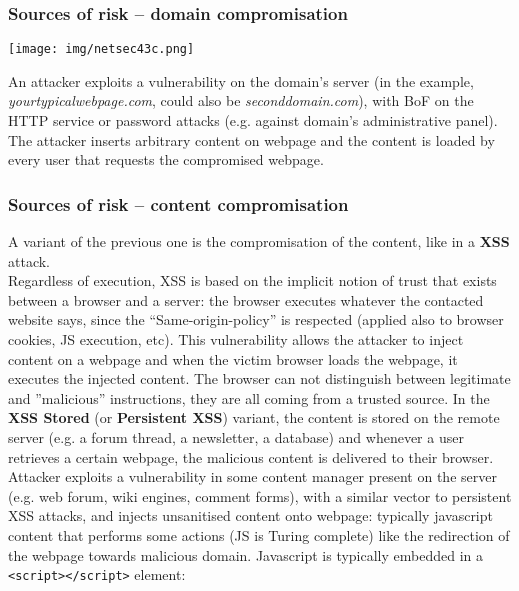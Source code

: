 \documentclass[a4paper, 10pt, titlepage]{article}
\begin{document}
\subsubsection*{Sources of risk – domain compromisation}
\begin{center}
	\texttt{[image: img/netsec43c.png]}
\end{center}
An attacker exploits a vulnerability on the domain’s server (in the example, \textit{yourtypicalwebpage.com}, could also be \textit{seconddomain.com}), with BoF on the HTTP service or password attacks (e.g. against domain’s administrative panel). The attacker inserts arbitrary content on webpage and the content is loaded by every user that requests the compromised webpage.

\subsubsection*{Sources of risk – content compromisation}
A variant of the previous one is the compromisation of the content, like in a \textbf{XSS} attack. \medskip\\
Regardless of execution, XSS is based on the implicit notion of trust that exists between a browser and a server: the browser executes whatever the contacted website says, since the “Same-origin-policy” is respected (applied also to browser cookies, JS execution, etc). This vulnerability allows the attacker to inject content on a webpage and when the victim browser loads the webpage, it executes the injected content. The browser can not distinguish between legitimate and ”malicious” instructions, they are all coming from a trusted source.
In the \textbf{XSS Stored} (or \textbf{Persistent XSS}) variant, the content is stored on the remote server (e.g. a forum thread, a newsletter, a database) and whenever a user retrieves a certain webpage, the malicious content is delivered to their browser. \medskip\\
Attacker exploits a vulnerability in some content manager present on the server (e.g. web forum, wiki engines, comment forms), with a similar vector to persistent XSS attacks, and injects unsanitised content onto webpage: typically javascript content that performs some actions (JS is Turing complete) like the redirection of the webpage towards malicious domain. Javascript is typically embedded in a \lstinline|<script></script>| element:
\end{document}
